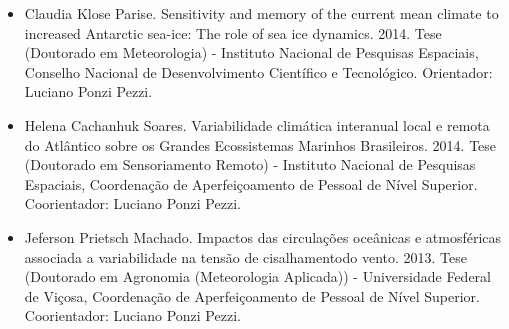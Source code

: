 \documentclass[11pt, a4paper]{awesome-cv}
\begin{document}
\begin{cvletter}
\begin{itemize}
  \item[] Claudia Klose Parise. Sensitivity and memory of the current mean climate to increased Antarctic sea-ice: The role of sea ice dynamics. 2014. Tese (Doutorado em Meteorologia) - Instituto Nacional de Pesquisas Espaciais, Conselho Nacional de Desenvolvimento Científico e Tecnológico. Orientador: Luciano Ponzi Pezzi. 
  \item[] Helena Cachanhuk Soares. Variabilidade climática interanual local e remota do Atlântico sobre os Grandes Ecossistemas Marinhos Brasileiros. 2014. Tese (Doutorado em Sensoriamento Remoto) - Instituto Nacional de Pesquisas Espaciais, Coordenação de Aperfeiçoamento de Pessoal de Nível Superior. Coorientador: Luciano Ponzi Pezzi. 
  \item[] Jeferson Prietsch Machado. Impactos das circulações oceânicas e atmosféricas associada a variabilidade na tensão de cisalhamentodo vento. 2013. Tese (Doutorado em Agronomia (Meteorologia Aplicada)) - Universidade Federal de Viçosa, Coordenação de Aperfeiçoamento de Pessoal de Nível Superior. Coorientador: Luciano Ponzi Pezzi. 
\end{itemize}


\end{cvletter}
\end{document}
